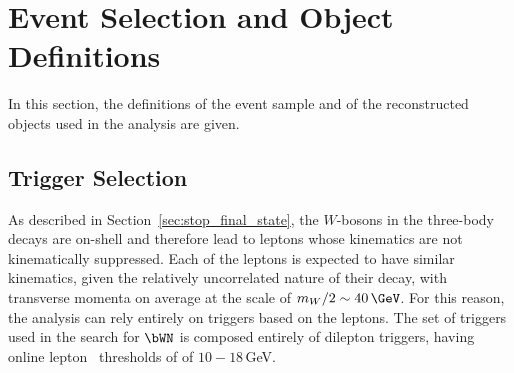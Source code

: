 \section{Event Selection and Object Definitions}
\label{sec:stop_event_sel}

In this section, the definitions of the event sample and of the reconstructed
objects used in the analysis are given.

%
%

\subsection{Trigger Selection}
\label{sec:stop_trigger}

As described in Section~\ref{sec:stop_final_state}, the $W$-bosons in the three-body
\stopone decays are on-shell and therefore lead to leptons whose kinematics are not
kinematically suppressed.
Each of the leptons is expected to have similar kinematics, given the relatively uncorrelated nature
of their decay, with transverse momenta on average at the scale of $m_W / 2 \sim 40\,\GeV$.
For this reason, the analysis can rely entirely on triggers based on the leptons.
The set of triggers used in the search for $\bWN$ is composed entirely of dilepton triggers,
having online lepton \pT~thresholds of of $10-18$\,GeV.

